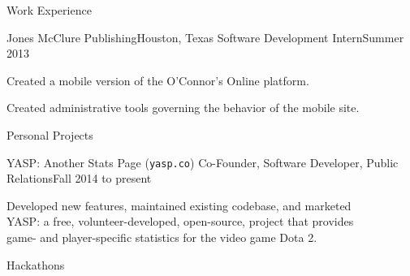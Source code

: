 \documentclass{resume}
\begin{document}







\begin{rSection}{Work Experience}

\begin{rSubSection}{Jones McClure Publishing}{Houston, Texas}
{Software Development Intern}{Summer 2013}
\item Created a mobile version of the O'Connor's Online platform.
\item Created administrative tools governing the behavior of the mobile site.
\end{rSubSection}

\end{rSection}





\iftoggle{cv}{\pagebreak}{}
\begin{rSection}{Personal Projects}

\begin{rSubSection}{YASP: Another Stats Page (\texttt{yasp.co})}{}
{Co-Founder, Software Developer, Public Relations}{Fall 2014 to present}
\item Developed new features, maintained existing codebase, and marketed \\
YASP: a free, volunteer-developed, open-source, project that provides \\
game- and player-specific statistics for the video game Dota 2.
\end{rSubSection}

\end{rSection}





\begin{rSection}{Hackathons}


\end{rSection}
\end{document}
